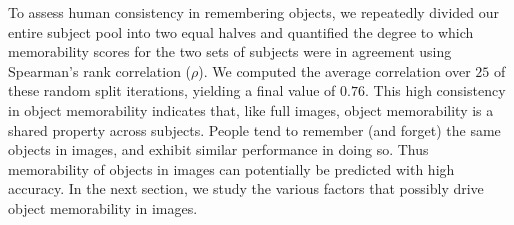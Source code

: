 To assess human consistency in remembering objects, we repeatedly divided our entire subject pool into two equal halves and quantified the degree to which memorability scores for the two sets of subjects were in agreement using Spearman’s rank correlation ($\rho$). We computed the average correlation over $25$ of these random split iterations, yielding a final value of $0.76$. This high consistency in object memorability indicates that, like full images, object memorability is a shared property across subjects. People tend to remember (and forget) the same objects in images, and exhibit similar performance in doing so. Thus memorability of objects in images can potentially be predicted with high accuracy. In the next section, we study the various factors that possibly drive object memorability in images.

